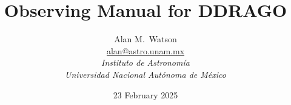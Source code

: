 \title{
\bfseries Observing Manual for DDRAGO
}

\author{
Alan M.\ Watson\\
\href{mailto:alan@astro.unam.mx}{alan@astro.unam.mx}\\[\medskipamount]
\itshape Instituto de Astronomía\\
\itshape Universidad Nacional Autónoma de México
}

\date{23 February 2025}

\maketitle

\tableofcontents